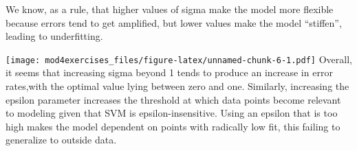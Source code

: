 \documentclass[
]{article}
\newenvironment{Shaded}{\begin{snugshade}}{\end{snugshade}}
\newcommand{\AttributeTok}[1]{\textcolor[rgb]{0.77,0.63,0.00}{#1}}
\newcommand{\ControlFlowTok}[1]{\textcolor[rgb]{0.13,0.29,0.53}{\textbf{#1}}}
\newcommand{\DecValTok}[1]{\textcolor[rgb]{0.00,0.00,0.81}{#1}}
\newcommand{\FloatTok}[1]{\textcolor[rgb]{0.00,0.00,0.81}{#1}}
\newcommand{\FunctionTok}[1]{\textcolor[rgb]{0.00,0.00,0.00}{#1}}
\newcommand{\NormalTok}[1]{#1}
\newcommand{\OtherTok}[1]{\textcolor[rgb]{0.56,0.35,0.01}{#1}}
\newcommand{\SpecialCharTok}[1]{\textcolor[rgb]{0.00,0.00,0.00}{#1}}
\newcommand{\StringTok}[1]{\textcolor[rgb]{0.31,0.60,0.02}{#1}}
\begin{document}
We know, as a rule, that higher values of sigma make the model more
flexible because errors tend to get amplified, but lower values make the
model ``stiffen'', leading to underfitting.

\begin{Shaded}
\end{Shaded}

\texttt{[image: mod4exercises\_files/figure-latex/unnamed-chunk-6-1.pdf]}
Overall, it seems that increasing sigma beyond 1 tends to produce an
increase in error rates,with the optimal value lying between zero and
one. Similarly, increasing the epsilon parameter increases the threshold
at which data points become relevant to modeling given that SVM is
epsilon-insensitive. Using an epsilon that is too high makes the model
dependent on points with radically low fit, this failing to generalize
to outside data.
\end{document}
